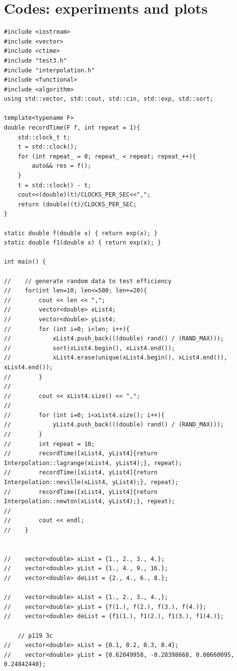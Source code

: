\documentclass[12pt]{article}
\begin{document}
\section{Codes: experiments and plots}
\begin{lstlisting}
#include <iostream>
#include <vector>
#include <ctime>
#include "test3.h"
#include "interpolation.h"
#include <functional>
#include <algorithm>
using std::vector, std::cout, std::cin, std::exp, std::sort;

template<typename F>
double recordTime(F f, int repeat = 1){
    std::clock_t t;
    t = std::clock();
    for (int repeat_ = 0; repeat_ < repeat; repeat_++){
        auto&& res = f();
    }
    t = std::clock() - t;
    cout<<(double)(t)/CLOCKS_PER_SEC<<",";
    return (double)(t)/CLOCKS_PER_SEC;
}

static double f(double x) { return exp(x); }
static double f1(double x) { return exp(x); }

int main() {

//    // generate random data to test efficiency
//    for(int len=10; len<=500; len+=20){
//        cout << len << ",";
//        vector<double> xList4;
//        vector<double> yList4;
//        for (int i=0; i<len; i++){
//            xList4.push_back(((double) rand() / (RAND_MAX)));
//            sort(xList4.begin(), xList4.end());
//            xList4.erase(unique(xList4.begin(), xList4.end()), xList4.end());
//        }
//
//        cout << xList4.size() << ",";
//
//        for (int i=0; i<xList4.size(); i++){
//            yList4.push_back(((double) rand() / (RAND_MAX)));
//        }
//        int repeat = 10;
//        recordTime([xList4, yList4]{return Interpolation::lagrange(xList4, yList4);}, repeat);
//        recordTime([xList4, yList4]{return Interpolation::neville(xList4, yList4);}, repeat);
//        recordTime([xList4, yList4]{return Interpolation::newton(xList4, yList4);}, repeat);
//
//        cout << endl;
//    }


//    vector<double> xList = {1., 2., 3., 4.};
//    vector<double> yList = {1., 4., 9., 16.};
//    vector<double> deList = {2., 4., 6., 8.};

//    vector<double> xList = {1., 2., 3., 4.,};
//    vector<double> yList = {f(1.), f(2.), f(3.), f(4.)};
//    vector<double> deList = {f1(1.), f1(2.), f1(3.), f1(4.)};

    // p119 3c
//    vector<double> xList = {0.1, 0.2, 0.3, 0.4};
//    vector<double> yList = {0.62049958, -0.28398668, 0.00660095, 0.24842440};


\end{lstlisting}
\end{document}
